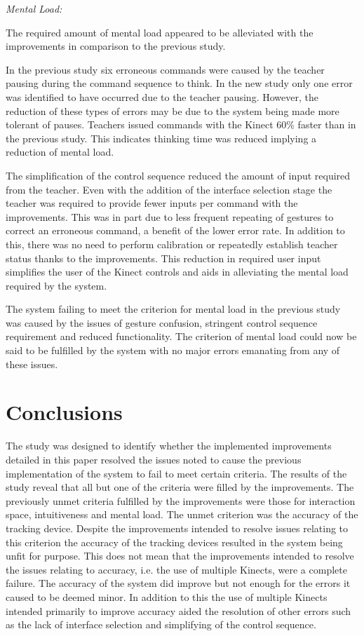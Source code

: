 \documentclass[link]{IWCOMP}
\begin{document}
\emph{Mental Load:}

The required amount of mental load appeared to be alleviated with the improvements in comparison to the previous study.

In the previous study six erroneous commands were caused by the teacher pausing during the command sequence to think.
In the new study only one error was identified to have occurred due to the teacher pausing.
However, the reduction of these types of errors may be due to the system being made more tolerant of pauses.
Teachers issued commands with the Kinect 60\% faster than in the previous study.
This indicates thinking time was reduced implying a reduction of mental load.

The simplification of the control sequence reduced the amount of input required from the teacher.
Even with the addition of the interface selection stage the teacher was required to provide fewer inputs per command with the improvements.
This was in part due to less frequent repeating of gestures to correct an erroneous command, a benefit of the lower error rate.
In addition to this, there was no need to perform calibration or repeatedly establish teacher status thanks to the improvements.
This reduction in required user input simplifies the user of the Kinect controls and aids in alleviating the mental load required by the system.

The system failing to meet the criterion for mental load in the previous study was caused by the issues of gesture confusion, stringent control sequence requirement and reduced functionality.
The criterion of mental load could now be said to be fulfilled by the system with no major errors emanating from any of these issues.

\section{Conclusions}
\label{sec:conclusions}



The study was designed to identify whether the implemented improvements detailed in this paper resolved the issues noted to cause the previous implementation of the system to fail to meet certain criteria.
The results of the study reveal that all but one of the criteria were filled by the improvements.
The previously unmet criteria fulfilled by the improvements were those for interaction space, intuitiveness and mental load.
The unmet criterion was the accuracy of the tracking device.
Despite the improvements intended to resolve issues relating to this criterion the accuracy of the tracking devices resulted in the system being unfit for purpose.
This does not mean that the improvements intended to resolve the issues relating to accuracy, i.e. the use of multiple Kinects, were a complete failure.
The accuracy of the system did improve but not enough for the errors it caused to be deemed minor.
In addition to this the use of multiple Kinects intended primarily to improve accuracy aided the resolution of other errors such as the lack of interface selection and simplifying of the control sequence.
\end{document}
